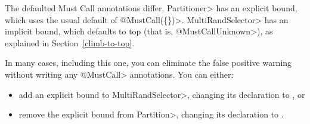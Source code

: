 The defaulted Must Call annotations differ.
\<Partitioner> has an explicit bound, which uses the usual default of \<@MustCall(\{\})>.
\<MultiRandSelector> has an implicit bound, which defaults to top (that is,
\<@MustCallUnknown>), as explained in Section~\ref{climb-to-top}.

In many cases, including this one, you can eliminate the false positive
warning without writing any \<@MustCall> annotations.
You can either:
\begin{itemize}
\item
  add an explicit bound to \<MultiRandSelector>, changing its declaration to
  , or
\item remove the explicit bound from \<Partition>, changing its declaration to
  .
\end{itemize}

